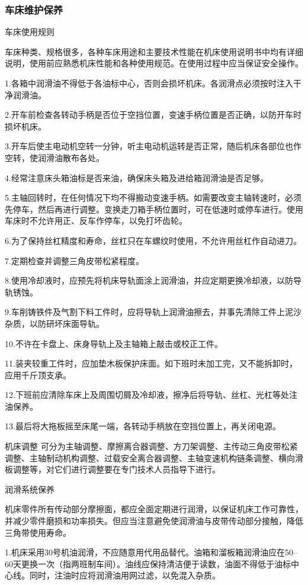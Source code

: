 \documentclass{ctexbook}
\begin{document}
\subsubsection{车床维护保养}
车床使用规则

车床种类、规格很多，各种车床用途和主要技术性能在机床使用说明书中均有详细说明，使用前应熟悉机床性能和各种使用规范。在使用过程中应当保证安全操作。

1.各箱中润滑油不得低于各油标中心，否则会损坏机床。各润滑点必须按时注入干净润滑油。

2.开车前检查各转动手柄是否位于空挡位置，变速手柄位置是否正确，以防开车时损坏机床。

3.开车后使主电动机空转一分钟，听主电动机运转是否正常，随后机床各部位也作空转，使润滑油散布各处。

4.经常注意床头箱油标是否来油，确保床头箱及进给箱润滑油是否足够。

5.主轴回转时，在任何情况下均不得搬动变速手柄。如需要改变主轴转速时，必须先停车，然后再进行调整。变换走刀箱手柄位置时，可在低速时或停车进行。使用车床时不允许用正、反车作停车，以免打坏齿轮。

6.为了保持丝杠精度和寿命，丝杠只在车螺纹时使用，不允许用丝杠作自动进刀。

7.定期检查并调整三角皮带松紧程度。

8.使用冷却液时，应预先将机床导轨面涂上润滑油，并应定期更换冷却液，以防导轨锈蚀。

9.车削铸铁件及气割下料工件时，应将导轨上润滑油擦去，并事先清除工件上泥沙杂质，以防研坏床面导轨。

10.不许在卡盘上、床身导轨上及主轴箱上敲击或校正工件。

11.装夹较重工件时，应加垫木板保护床面。如下班时未加工完，又不能拆卸时，应用千斤顶支承。

12.下班前应清除车床上及周围切屑及冷却液，擦净后将导轨、丝杠、光杠等处注油保养。

13.最后将大拖板摇至床尾一端，各转动手柄放在空挡位置上，再关闭电源。	

机床调整
可分为主轴调整、摩擦离合器调整、方刀架调整、主传动三角皮带松紧调整、主轴制动机构调整、过载安全离合器调整、主轴变速机构链条调整、横向滑板调整等，对它们进行调整要在专门技术人员指导下进行。

润滑系统保养

机床零件所有传动部分摩擦面，都应全面定期进行润滑，以保证机床工作可靠性，并减少零件磨损和功率损失。但应当注意避免使润滑油与皮带传动部分接触，降低三角带使用寿命。

1.机床采用30号机油润滑，不应随意用代用品替代。油箱和溜板箱润滑油应在50--60天更换一次（指两班制车间）。油线应保持清洁便于读数，油面不得低于油标中心线。同时，注油时应将润滑油用网过滤，以免混入杂质。
\end{document}
